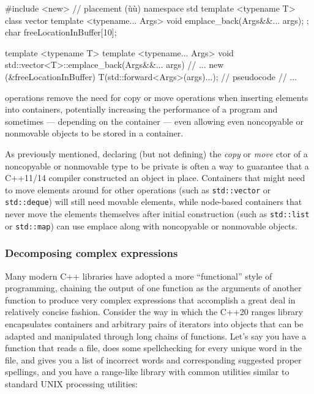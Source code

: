 \begin{emcppshiddenlisting}[emcppsbatch=e12]
#include <new>     // placement (ù{}ù)
namespace std {
template <typename T>
class vector {
    template <typename... Args>
    void emplace_back(Args&&... args);
};
char freeLocationInBuffer[10];
}
\end{emcppshiddenlisting}
\begin{emcppslisting}[emcppsbatch=e12]
template <typename T>
template <typename... Args>
void std::vector<T>::emplace_back(Args&&... args)
{
    // ...
    new (&freeLocationInBuffer) T(std::forward<Args>(args)...);  // pseudocode
    // ...
}
\end{emcppslisting}

\noindent {} operations remove the need for copy or move
operations when inserting elements into containers, potentially
increasing the performance of a program and sometimes --- depending on the
container --- even allowing even noncopyable or nonmovable objects to be stored
in a container.

As previously mentioned,
declaring (but not defining) the \emph{copy} or \emph{move} ctor of a
noncopyable or nonmovable type to be private is often a way to guarantee that
a C++11/14 compiler constructed an object in place.
Containers that might need to move elements around for other operations
(such as \lstinline!std::vector! or \lstinline!std::deque!) will still need
movable elements, while node-based containers that never move the
elements themselves after initial construction (such as
\lstinline!std::list! or \lstinline!std::map!) can use emplace along with
noncopyable or nonmovable objects.

\subsubsection[Decomposing complex expressions]{Decomposing complex expressions}\label{decomposing-complex-expressions}

Many modern C++ libraries have adopted a more ``functional'' style of
programming, chaining the output of one function as the arguments of
another function to produce very complex expressions that accomplish a
great deal in relatively concise fashion. Consider the way in which the
C++20 ranges library encapsulates containers and arbitrary pairs of
iterators into objects that can be adapted and manipulated through long
chains of functions. Let's say you have a function that reads a file,
does some spellchecking for every unique word in the file, and gives you a
list of incorrect words and corresponding suggested proper spellings,
and you have a range-like library with common utilities similar to
standard UNIX processing utilities:

